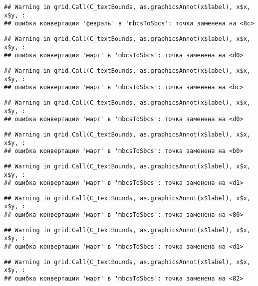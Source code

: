 \documentclass[
]{article}
\begin{document}
\begin{verbatim}
## Warning in grid.Call(C_textBounds, as.graphicsAnnot(x$label), x$x, x$y, :
## ошибка конвертации 'февраль' в 'mbcsToSbcs': точка заменена на <8c>
\end{verbatim}

\begin{verbatim}
## Warning in grid.Call(C_textBounds, as.graphicsAnnot(x$label), x$x, x$y, :
## ошибка конвертации 'март' в 'mbcsToSbcs': точка заменена на <d0>
\end{verbatim}

\begin{verbatim}
## Warning in grid.Call(C_textBounds, as.graphicsAnnot(x$label), x$x, x$y, :
## ошибка конвертации 'март' в 'mbcsToSbcs': точка заменена на <bc>
\end{verbatim}

\begin{verbatim}
## Warning in grid.Call(C_textBounds, as.graphicsAnnot(x$label), x$x, x$y, :
## ошибка конвертации 'март' в 'mbcsToSbcs': точка заменена на <d0>
\end{verbatim}

\begin{verbatim}
## Warning in grid.Call(C_textBounds, as.graphicsAnnot(x$label), x$x, x$y, :
## ошибка конвертации 'март' в 'mbcsToSbcs': точка заменена на <b0>
\end{verbatim}

\begin{verbatim}
## Warning in grid.Call(C_textBounds, as.graphicsAnnot(x$label), x$x, x$y, :
## ошибка конвертации 'март' в 'mbcsToSbcs': точка заменена на <d1>
\end{verbatim}

\begin{verbatim}
## Warning in grid.Call(C_textBounds, as.graphicsAnnot(x$label), x$x, x$y, :
## ошибка конвертации 'март' в 'mbcsToSbcs': точка заменена на <80>
\end{verbatim}

\begin{verbatim}
## Warning in grid.Call(C_textBounds, as.graphicsAnnot(x$label), x$x, x$y, :
## ошибка конвертации 'март' в 'mbcsToSbcs': точка заменена на <d1>
\end{verbatim}

\begin{verbatim}
## Warning in grid.Call(C_textBounds, as.graphicsAnnot(x$label), x$x, x$y, :
## ошибка конвертации 'март' в 'mbcsToSbcs': точка заменена на <82>
\end{verbatim}
\end{document}
